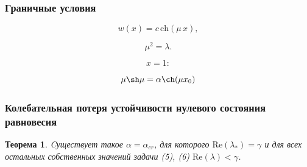 \documentclass[fullscreen=true, unicode, bookmarks=false]{beamer}
\newtheorem{rustheorem}{Теорема }
\begin{document}
\begin{frame}
\frametitle{ Граничные условия }

$$ w(x) = c \, \mbox{ch} (\mu\,x), $$

$$ \mu^2 = \lambda. $$

\vspace{1.1cm}
\pause
	
$$ x = 1: $$

\begin{equation}\label{eq7}	
	\mu \sh \mu = \alpha \ch(\mu x_0)
\end{equation}

\end{frame}

\begin{frame}
\frametitle{Колебательная потеря устойчивости нулевого состояния равновесия }
	
\begin{rustheorem}
Cуществует такое $ \alpha=\alpha_{cr} $, для которого $ \mbox{Re}(\lambda_{*}) = \gamma $ и для всех остальных собственных значений задачи (5), (6) $ \mbox{Re}(\lambda) < \gamma $. 
\end{rustheorem}

\end{frame}
\end{document}
